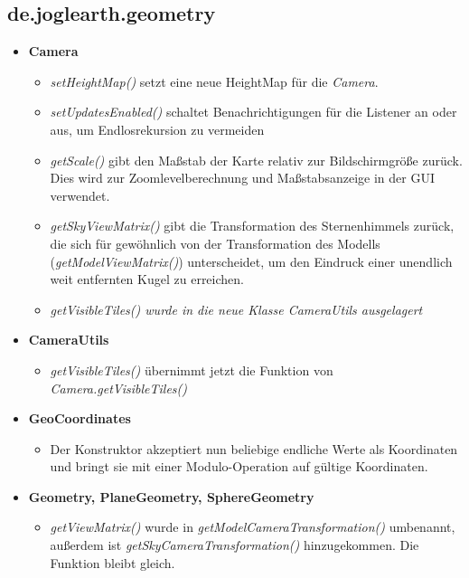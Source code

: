 \documentclass[10pt]{scrreprt}
\begin{document}
\subsection*{de.joglearth.geometry}
\begin{itemize}
\item \textbf{Camera} \begin{itemize}
\item \textit{setHeightMap()} setzt eine neue HeightMap für die \textit{Camera}.
\item \textit{setUpdatesEnabled()} schaltet Benachrichtigungen für die Listener an oder aus, um Endlosrekursion zu vermeiden
\item \textit{getScale()} gibt den Maßstab der Karte relativ zur Bildschirmgröße zurück. Dies wird zur Zoomlevelberechnung und Maßstabsanzeige in der GUI verwendet.
\item \textit{getSkyViewMatrix()} gibt die Transformation des Sternenhimmels zurück, die sich für gewöhnlich von der Transformation des Modells (\textit{getModelViewMatrix()}) unterscheidet, um den Eindruck einer unendlich weit entfernten Kugel zu erreichen.
\item \textit{getVisibleTiles() wurde in die neue Klasse CameraUtils ausgelagert}
\end{itemize}
\item \textbf{CameraUtils} \begin{itemize}
\item \textit{getVisibleTiles()} übernimmt jetzt die Funktion von \textit{Camera.getVisibleTiles()}
\end{itemize}
\item \textbf{GeoCoordinates} \begin{itemize}
\item Der Konstruktor akzeptiert nun beliebige endliche Werte als Koordinaten und bringt sie mit einer Modulo-Operation auf gültige Koordinaten.
\end{itemize}
\item \textbf{Geometry, PlaneGeometry, SphereGeometry} \begin{itemize}
\item \textit{getViewMatrix()} wurde in \textit{getModelCameraTransformation()} umbenannt, außerdem ist \textit{getSkyCameraTransformation()} hinzugekommen. Die Funktion bleibt gleich.
\end{itemize}
\end{itemize}
\end{document}
